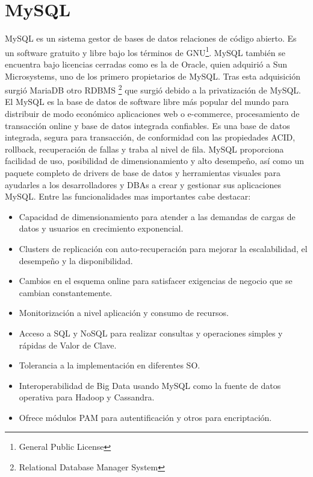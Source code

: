 \documentclass{article}
\begin{document}
\section{MySQL}
MySQL es un sistema gestor de bases de datos relaciones de código abierto. 
Es un software gratuito y libre bajo los términos de GNU\footnote{General Public License}. MySQL también se encuentra bajo licencias cerradas como es la de Oracle, quien adquirió a Sun Microsystems, uno de los primero propietarios de MySQL. Tras esta adquisición surgió MariaDB otro RDBMS \footnote{Relational Database Manager System} que surgió debido a la privatización de MySQL.\\

El MySQL es la base de datos de software libre más popular del mundo para distribuir de modo económico aplicaciones web o e-commerce, procesamiento de transacción online y base de datos integrada confiables.  Es una base de datos integrada, segura para transacción, de conformidad con las propiedades ACID, rollback, recuperación de fallas y traba al nivel de fila. MySQL proporciona facilidad de uso, posibilidad de dimensionamiento y alto desempeño, así como un paquete completo de drivers de base de datos y herramientas visuales para ayudarles a los desarrolladores y DBAs a crear y gestionar sus aplicaciones MySQL. 
Entre las funcionalidades mas importantes cabe destacar: 
\begin{itemize}
\item  Capacidad de dimensionamiento para atender a las demandas de cargas de datos y usuarios en crecimiento exponencial.
\item  Clusters de replicación con auto-recuperación para mejorar la escalabilidad, el desempeño y la disponibilidad.
\item  Cambios en el esquema online para satisfacer exigencias de negocio que se cambian constantemente.
\item Monitorización a nivel aplicación y consumo de recursos.
\item  Acceso a SQL y NoSQL para realizar consultas y operaciones simples y rápidas de Valor de Clave.
\item Tolerancia a la implementación en diferentes SO.
\item  Interoperabilidad de Big Data usando MySQL como la fuente de datos operativa para Hadoop y Cassandra. \cite{guiaenterprise}
\item Ofrece módulos PAM para autentificación y otros para encriptación.
\end{itemize}
\end{document}
